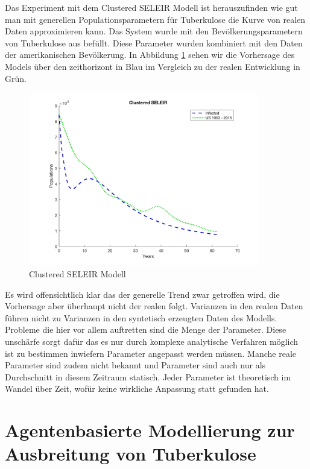 \documentclass[paper=a4, fontsize=11pt, ngerman, abstract=on]{scrartcl}
\numberwithin{equation}{section} %
\numberwithin{figure}{section} %
\numberwithin{table}{section} %
\begin{document}
Das Experiment mit dem Clustered SELEIR Modell ist herauszufinden wie gut man mit generellen Populationsparametern für Tuberkulose die Kurve von realen Daten approximieren kann. Das System wurde mit den Bevölkerungsparametern von Tuberkulose aus \cite{Trauer2014} befüllt. Diese Parameter wurden kombiniert mit den Daten der amerikanischen Bevölkerung. In Abbildung \ref{fig:clustered-seleir-compare} sehen wir die Vorhersage des Models über den zeithorizont in Blau im Vergleich zu der realen Entwicklung in Grün.

\begin{figure}[ht]
  \centering
  \includegraphics[width=0.9\textwidth,keepaspectratio]{images/clustered_seleir_against_us_data}
  \caption{Clustered SELEIR Modell}
  \label{fig:clustered-seleir-compare}
\end{figure}

Es wird offensichtlich klar das der generelle Trend zwar getroffen wird, die Vorhersage aber überhaupt nicht der realen folgt. Varianzen in den realen Daten führen nicht zu Varianzen in den syntetisch erzeugten Daten des Modells. Probleme die hier vor allem auftretten sind die Menge der Parameter. Diese unschärfe sorgt dafür das es nur durch komplexe analytische Verfahren möglich ist zu bestimmen inwiefern Parameter angepasst werden müssen. Manche reale Parameter sind zudem nicht bekannt und Parameter sind auch nur als Durchschnitt in diesem Zeitraum statisch. Jeder Parameter ist theoretisch im Wandel über Zeit, wofür keine wirkliche Anpassung statt gefunden hat.

\section{Agentenbasierte Modellierung zur Ausbreitung von Tuberkulose}
\end{document}
